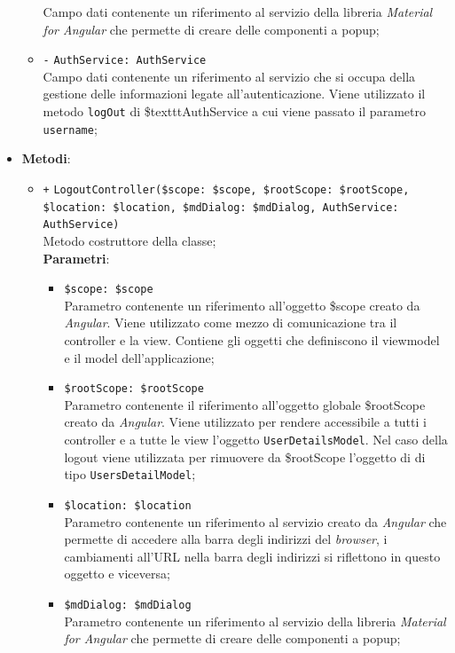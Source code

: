 \begin{itemize}
\begin{itemize}
		Campo dati contenente un riferimento al servizio della libreria \textit{Material for Angular} che permette di creare delle componenti a popup;
		\item \texttt{-} \texttt{AuthService: AuthService} \\
		Campo dati contenente un riferimento al servizio che si occupa della gestione delle informazioni legate all’autenticazione. Viene utilizzato il metodo \texttt{logOut} di \$texttt{AuthService} a cui viene passato il parametro \texttt{username};
	\end{itemize}
	\item \textbf{Metodi}:
	\begin{itemize}
		\item \texttt{+} \texttt{LogoutController(\$scope: \$scope, \$rootScope: \$rootScope, \$location: \$location, \$mdDialog: \$mdDialog, AuthService: AuthService)} \\
		Metodo costruttore della classe; \\
		\textbf{Parametri}:
		\begin{itemize}
			\item \texttt{\$scope: \$scope} \\
			Parametro contenente un riferimento all’oggetto \$scope creato da \textit{Angular}. Viene utilizzato come mezzo di comunicazione tra il controller e la view. Contiene gli oggetti che definiscono il viewmodel e il model dell’applicazione;
			\item \texttt{\$rootScope: \$rootScope} \\
			Parametro contenente il riferimento all'oggetto globale \$rootScope creato da \textit{Angular}. Viene utilizzato per rendere accessibile a tutti i controller e a tutte le view l'oggetto \texttt{UserDetailsModel}. Nel caso della logout viene utilizzata per rimuovere da \$rootScope l'oggetto di di tipo \texttt{UsersDetailModel};
			\item \texttt{\$location: \$location} \\
			Parametro contenente un riferimento al servizio creato da \textit{Angular} che permette di accedere alla barra degli indirizzi del \textit{browser}, i cambiamenti all’URL nella barra degli indirizzi si riflettono in questo oggetto e viceversa;
			\item \texttt{\$mdDialog: \$mdDialog} \\
			Parametro contenente un riferimento al servizio della libreria \textit{Material for Angular} che permette di creare delle componenti a popup;

\end{itemize}
\end{itemize}
\end{itemize}
